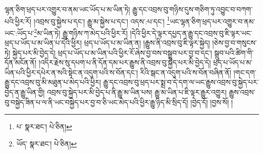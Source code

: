 ལྷན་ཅིག་ཕྲད་པར་འགྱུར་བ་ནམ་ཡང་ཡོད་པ་མ་ཡིན་ཏེ། རྒྱུ་དང་འབྲས་བུ་གཉིས་དུས་གཅིག་ཏུ་འབྱུང་བ་བཀག་པའི་ཕྱིར་རོ། །འབྲས་བུ་སྐྱེས་པ་དང་། རྒྱུ་མ་སྐྱེས་པ་དང་། འདས་:པ་དང་། \footnote{པ་  སྣར་ཐང་།  པེ་ཅིན། }ཡང་ལྷན་ཅིག་ཕྲད་པར་འགྱུར་བ་ནམ་ཡང་:ཡོད་པ་\footnote{ཡོད་  སྣར་ཐང་།  པེ་ཅིན། }མ་ཡིན་ཏེ། རྒྱུ་གཉིས་ཀ་མེད་པའི་ཕྱིར་རོ། །དེའི་ཕྱིར་དེ་ལྟར་དཔྱད་ན་རྒྱུ་དང་འབྲས་བུ་ཇི་ལྟར་ཡང་ཕྲད་པ་ཡོད་པ་མ་ཡིན་པ་དེའི་ཕྱིར། ཕྲད་པ་ཡོད་པ་མ་ཡིན་ན། །རྒྱུས་ནི་འབྲས་བུ་ཇི་ལྟར་སྐྱེད། །ཅེས་བྱ་བ་གསུངས་ཏེ། སྐྱེད་པར་མི་བྱེད་དེ། ཕྲད་པ་ཡོད་པ་མ་ཡིན་པའི་ཕྱིར་རོ་ཞེས་བྱ་བས་བསྒྲུབ་པར་བྱ་བ་དང་། སྒྲུབ་པའི་ཚིག་གི་དོན་མངོན་ནོ། །འདིར་རྗེས་སུ་དཔག་པ་ནི་དོན་དམ་པར་རྒྱུས་ནི་འབྲས་བུ་སྐྱེད་པར་མི་བྱེད་དེ། ཕྲད་པ་ཡོད་པ་མ་ཡིན་པའི་ཕྱིར་དཔེར་ན་སའི་སྟེང་ན་འདུག་པའི་ས་བོན་དང་། རིའི་སྒང་ན་འདུག་པའི་ས་བོན་བཞིན་ནོ། །གང་དག་རྒྱུ་དང་འབྲས་བུ་མི་མཐུན་པ་མེད་པའི་ཕྱིར། རྒྱུ་དང་འབྲས་བུ་ཕྲད་པར་སྨྲ་བ་དེ་དག་ལ་ཡང་རྒྱུས་འབྲས་བུ་སྐྱེད་པར་བྱེད་ན་རྒྱུ་ཡིན་གྱི། འབྲས་བུ་སྐྱེད་པར་མི་བྱེད་པ་ནི་རྒྱུ་མ་ཡིན་པས། རྒྱུ་མ་ཡིན་པ་ཇི་ལྟར་རྒྱུར་འགྱུར། རྒྱུས་འབྲས་བུ་བསྐྱེད་ཟིན་པ་ལ་ནི་ཡང་བསྐྱེད་པར་བྱ་བ་ཅི་ཡང་མེད་པའི་ཕྱིར་རྒྱུ་ཉིད་མི་སྲིད་དོ། །བྱེད་དོ། །བྱས་སོ། །
